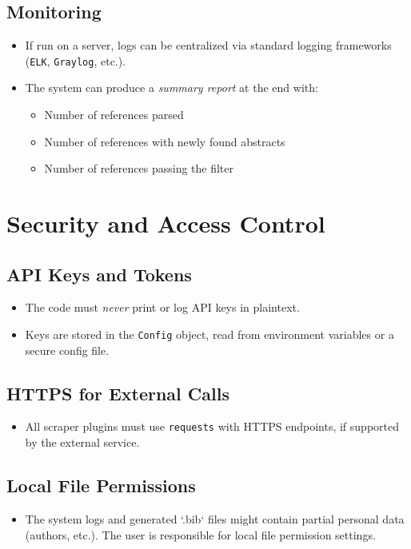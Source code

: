\documentclass[12pt]{article}
\begin{document}
\subsection{Monitoring}
\begin{itemize}
  \item If run on a server, logs can be centralized via standard logging frameworks (\texttt{ELK}, \texttt{Graylog}, etc.).
  \item The system can produce a \emph{summary report} at the end with:
    \begin{itemize}
      \item Number of references parsed
      \item Number of references with newly found abstracts
      \item Number of references passing the filter
    \end{itemize}
\end{itemize}

\section{Security and Access Control}

\subsection{API Keys and Tokens}
\begin{itemize}
  \item The code must \emph{never} print or log API keys in plaintext.
  \item Keys are stored in the \texttt{Config} object, read from environment variables or a secure config file.
\end{itemize}

\subsection{HTTPS for External Calls}
\begin{itemize}
  \item All scraper plugins must use \texttt{requests} with HTTPS endpoints, if supported by the external service.
\end{itemize}

\subsection{Local File Permissions}
\begin{itemize}
  \item The system logs and generated `.bib` files might contain partial personal data (authors, etc.). The user is responsible for local file permission settings.
\end{itemize}
\end{document}

